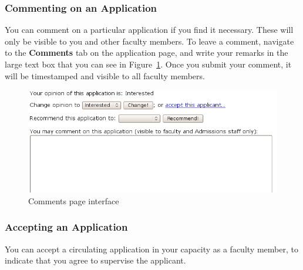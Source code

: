 \documentclass[titlepage]{article}
\begin{document}
\subsubsection{Commenting on an Application}
You can comment on a particular application if you find it necessary.  These
will only be visible to you and other faculty members.  To leave a comment,
navigate to the \textbf{\textsf{Comments}} tab on the application page, and write your
remarks in the large text box that you can see in Figure~\ref{yCommentsPage}.
Once you submit your comment, it will be timestamped and visible to all
faculty members.

\begin{figure}[h!]
  \begin{center}
    \includegraphics[width=13cm]{commentspage.png}
  \end{center}
  \caption{Comments page interface}
  \label{yCommentsPage}
\end{figure}

\subsubsection{Accepting an Application}
You can accept a circulating application in your capacity as a faculty member,
to indicate that you agree to supervise the applicant.
\end{document}
